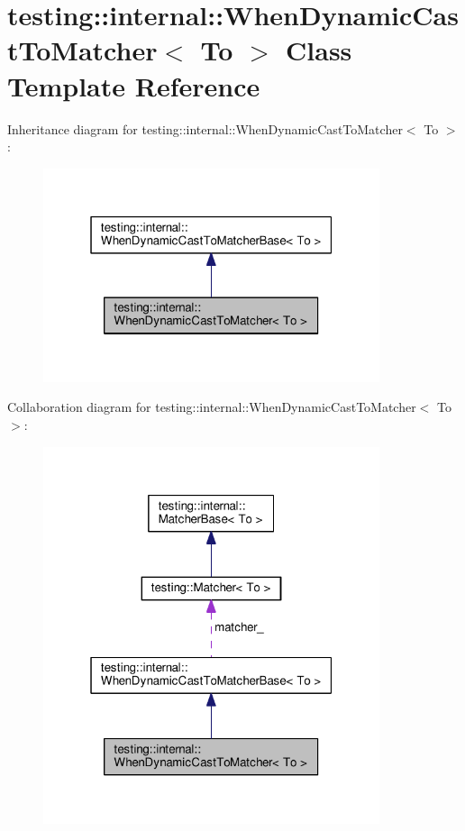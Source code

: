 \hypertarget{classtesting_1_1internal_1_1WhenDynamicCastToMatcher}{}\section{testing\+:\+:internal\+:\+:When\+Dynamic\+Cast\+To\+Matcher$<$ To $>$ Class Template Reference}
\label{classtesting_1_1internal_1_1WhenDynamicCastToMatcher}


Inheritance diagram for testing\+:\+:internal\+:\+:When\+Dynamic\+Cast\+To\+Matcher$<$ To $>$\+:\nopagebreak
\begin{figure}[H]
\begin{center}
\leavevmode
\includegraphics[width=280pt]{classtesting_1_1internal_1_1WhenDynamicCastToMatcher__inherit__graph}
\end{center}
\end{figure}


Collaboration diagram for testing\+:\+:internal\+:\+:When\+Dynamic\+Cast\+To\+Matcher$<$ To $>$\+:\nopagebreak
\begin{figure}[H]
\begin{center}
\leavevmode
\includegraphics[width=280pt]{classtesting_1_1internal_1_1WhenDynamicCastToMatcher__coll__graph}
\end{center}
\end{figure}

